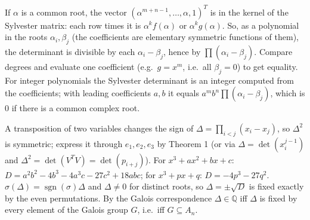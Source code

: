 \documentclass[11pt,a4paper]{article}
\begin{document}
 If $\alpha$ is a common root, the vector $(\alpha^{m+n-1},\dots,\alpha,1)^T$ is in the kernel of the Sylvester matrix: each row times it is $\alpha^kf(\alpha)$ or $\alpha^kg(\alpha)$.
 So, as a polynomial in the roots $\alpha_i,\beta_j$ (the coefficients are elementary symmetric functions of them), the determinant is divisible by each $\alpha_i-\beta_j$, hence by $\prod(\alpha_i-\beta_j)$. Compare degrees and evaluate one coefficient (e.g.\ $g=x^m$, i.e.\ all $\beta_j=0$) to get equality.
 For integer polynomials the Sylvester determinant is an integer computed from the coefficients; with leading coefficients $a,b$ it equals $a^mb^n\prod(\alpha_i-\beta_j)$, which is $0$ if there is a common complex root.

 A transposition of two variables changes the sign of $\Delta=\prod_{i<j}(x_i-x_j)$, so $\Delta^2$ is symmetric; express it through $e_1,e_2,e_3$ by Theorem 1 (or via $\Delta=\det(x_i^{j-1})$ and $\Delta^2=\det(V^TV)=\det(p_{i+j})$).
 For $x^3+ax^2+bx+c$: $D=a^2b^2-4b^3-4a^3c-27c^2+18abc$; for $x^3+px+q$: $D=-4p^3-27q^2$.
 $\sigma(\Delta)=\operatorname{sgn}(\sigma)\Delta$ and $\Delta\ne0$ for distinct roots, so $\Delta=\pm\sqrt D$ is fixed exactly by the even permutations. By the Galois correspondence $\Delta\in\mathbb{Q}$ iff $\Delta$ is fixed by every element of the Galois group $G$, i.e.\ iff $G\subseteq A_n$.
\end{document}

